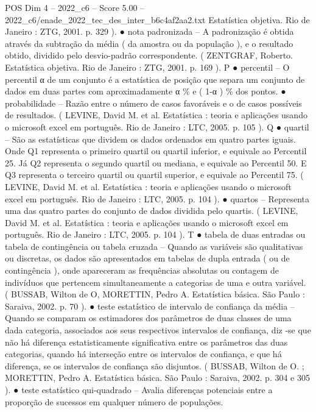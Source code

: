 \begin{textsample}{POS Dim 4 – 2022\_c6 – Score 5.00 – 2022\_c6/enade\_2022\_tec\_des\_inter\_b6c4af2aa2.txt}
Estatística objetiva.
Rio de Janeiro : ZTG, 2001. p. 329 ). {\EmojiFont ●} nota padronizada – A padronização é obtida através da subtração da média ( da amostra ou da população ), e o resultado obtido, dividido pelo desvio-padrão correspondente. ( ZENTGRAF, Roberto.
Estatística objetiva.
Rio de Janeiro : ZTG, 2001. p. 169 ).
P {\EmojiFont ●} percentil – O percentil α de um conjunto é a estatística de posição que separa um conjunto de dados em duas partes com aproximadamente α \% e ( 1-α ) \% dos pontos. {\EmojiFont ●} probabilidade – Razão entre o número de casos favoráveis e o de casos possíveis de resultados. ( LEVINE, David M. et al.
Estatística : teoria e aplicações usando o microsoft excel em português.
Rio de Janeiro : LTC, 2005. p. 105 ).
Q {\EmojiFont ●} quartil – São as estatísticas que dividem os dados ordenados em quatro partes iguais.
Onde Q1 representa o primeiro quartil ou quartil inferior, e equivale ao Percentil 25.
Já Q2 representa o segundo quartil ou mediana, e equivale ao Percentil 50.
E Q3 representa o terceiro quartil ou quartil superior, e equivale ao Percentil 75. ( LEVINE, David M. et al.
Estatística : teoria e aplicações usando o microsoft excel em português.
Rio de Janeiro : LTC, 2005. p. 104 ). {\EmojiFont ●} quartos – Representa uma das quatro partes do conjunto de dados dividida pelo quartis. ( LEVINE, David M. et al.
Estatística : teoria e aplicações usando o microsoft excel em português.
Rio de Janeiro : LTC, 2005. p. 104 ).
T {\EmojiFont ●} tabela de duas entradas ou tabela de contingência ou tabela cruzada – Quando as variáveis são qualitativas ou discretas, os dados são apresentados em tabelas de dupla entrada ( ou de contingência ), onde apareceram as frequências absolutas ou contagem de indivíduos que pertencem simultaneamente a categorias de uma e outra variável. ( BUSSAB, Wilton de O, MORETTIN, Pedro A.
Estatística básica.
São Paulo : Saraiva, 2002. p. 70 ). {\EmojiFont ●} teste estatístico de intervalo de confiança da média – Quando se comparam os estimadores dos parâmetros de duas classes de uma dada categoria, associados aos seus respectivos intervalos de confiança, diz -se que não há diferença estatisticamente significativa entre os parâmetros das duas categorias, quando há interseção entre os intervalos de confiança, e que há diferença, se os intervalos de confiança são disjuntos. ( BUSSAB, Wilton de O. ; MORETTIN, Pedro A.
Estatística básica.
São Paulo : Saraiva, 2002. p. 304 e 305 ). {\EmojiFont ●} teste estatístico qui-quadrado – Avalia diferenças potenciais entre a proporção de sucessos em qualquer número de populações.

\end{textsample}

